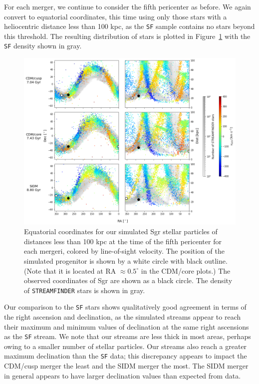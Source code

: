 For each merger, we continue to consider the fifth pericenter as before. We
again convert to equatorial coordinates, this time using only those stars with a
heliocentric distance less than 100 kpc, as the \verb|SF| sample
contains no stars beyond this threshold. The resulting distribution of stars is
plotted in Figure~\ref{fig:equatorial} with the \verb|SF| density
shown in gray.

\begin{figure}
    \centering 
    \includegraphics[width=1.0\linewidth]{figs/equatorial_streamfinder.png}
    \caption{%
        Equatorial coordinates for our simulated Sgr stellar particles of
        distances less than 100 kpc at the time of the fifth pericenter for
        each mergeri, colored by line-of-sight velocity.  The position of the
        simulated progenitor is shown by a white circle with black outline.
        (Note that it is located at RA $\approx 0.5^\circ$ in the CDM/core
        plots.) The observed coordinates of Sgr are shown as a black circle.
        The density of \texttt{STREAMFINDER} stars is shown in gray.
    }
    \label{fig:equatorial}
\end{figure}

Our comparison to the \verb|SF| stars shows qualitatively good agreement in
terms of the right ascension and declination, as the simulated streams appear
to reach their maximum and minimum values of declination at the same right
ascensions as the \verb|SF| stream.  We note that our streams are less thick
in most areas, perhaps owing to a smaller number of stellar particles.  Our
streams also reach a greater maximum declination than the \verb|SF| data; this
discrepancy appears to impact the CDM/cusp merger the least and the SIDM
merger the most.  The SIDM merger in general appears to have larger
declination values than expected from data.

